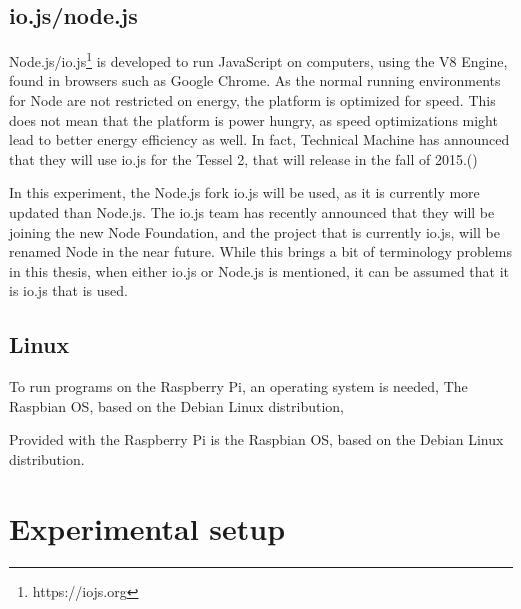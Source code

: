 
\subsection{io.js/node.js}
Node.js/io.js\footnote{https://iojs.org} is developed to run JavaScript on computers, using the V8 Engine, found in browsers such as Google Chrome.
As the normal running environments for Node are not restricted on energy, the platform is optimized for speed.
This does not mean that the platform is power hungry, as speed optimizations might lead to better energy efficiency as well.
In fact, Technical Machine has announced that they will use io.js for the Tessel 2, that will release in the fall of 2015.(\cite{movingfaster})

In this experiment, the Node.js fork io.js will be used, as it is currently more updated than Node.js.
The io.js team has recently announced that they will be joining the new Node Foundation, and the project that is currently io.js, will be renamed Node in the near future.
While this brings a bit of terminology problems in this thesis, when either io.js or Node.js is mentioned, it can be assumed that it is io.js that is used.


\subsection{Linux}
To run programs on the Raspberry Pi, an operating system is needed, 
The Raspbian OS, based on the Debian Linux distribution, 

Provided with the Raspberry Pi is the Raspbian OS, based on the Debian Linux distribution.





\section{Experimental setup}

